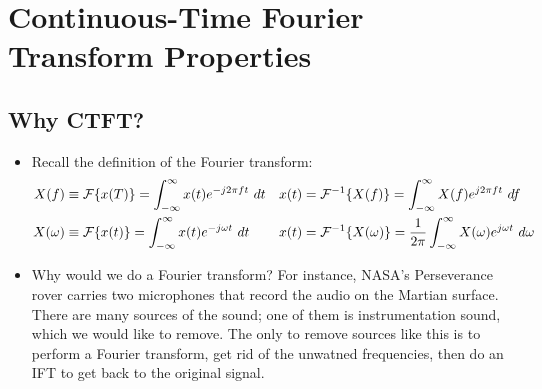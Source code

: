 \section{Continuous-Time Fourier Transform Properties}
\subsection{Why CTFT?} 
\begin{itemize}
	\item Recall the definition of the Fourier transform:
		\begin{align*}
			X(f) &\equiv \mathcal F \{x(T)\} = \int_{-\infty}^{\infty} x(t) 
			e^{- j 2 \pi ft}\ d t & x(t) &= \mathcal F^{-1} \{X(f)\} = \int_{-\infty}^{\infty} X(f) e^{j 2 \pi f t}
			\ d  f\\
			X(\omega) &\equiv \mathcal F \{x(t)\} = \int_{-\infty}^{\infty} x(t) e^{- j \omega t}\ d t & 
			x(t) &= \mathcal F^{-1} \{X(\omega)\}  = \frac{1}{2\pi}\int_{-\infty}^{\infty}  X(\omega) e^{j \omega t}
			\ d \omega
		\end{align*}
	\item Why would we do a Fourier transform? For instance, NASA's Perseverance rover carries two microphones that 
		record the audio on the Martian surface. There are many sources of the sound; one of them is instrumentation
		sound, which we would like to remove. The only to remove sources like this is to perform a Fourier transform, 
		get rid of the unwatned frequencies, then do an IFT to get back to the original signal.
\end{itemize}
